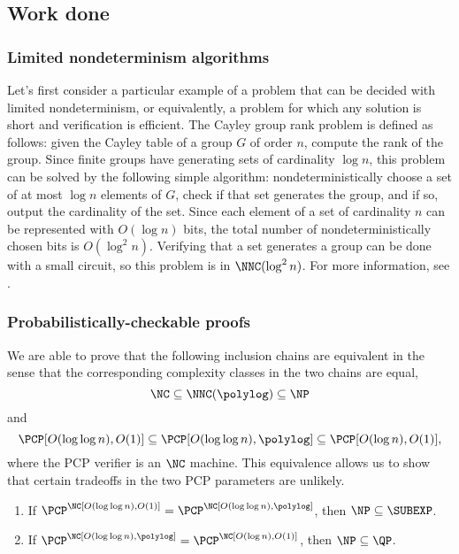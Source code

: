 \documentclass{article}
\begin{document}
\subsection{Work done}

\subsubsection{Limited nondeterminism algorithms}

Let's first consider a particular example of a problem that can be decided with limited nondeterminism, or equivalently, a problem for which any solution is short and verification is efficient.
The Cayley group rank problem is defined as follows: given the Cayley table of a group $G$ of order $n$, compute the rank of the group.
Since finite groups have generating sets of cardinality $\log n$, this problem can be solved by the following simple algorithm: nondeterministically choose a set of at most $\log n$ elements of $G$, check if that set generates the group, and if so, output the cardinality of the set.
Since each element of a set of cardinality $n$ can be represented with $O(\log n)$ bits, the total number of nondeterministically chosen bits is $O(\log^2 n)$.
Verifying that a set generates a group can be done with a small circuit, so this problem is in $\NNC(\log^2 n)$.
For more information, see \autocite{grouprank}.

\subsubsection{Probabilistically-checkable proofs}
\label{sec:ncpcp}

We are able to prove that the following inclusion chains are equivalent in the sense that the corresponding complexity classes in the two chains are equal,
\begin{equation*}
  \NC \subseteq \NNC(\polylog) \subseteq \NP
\end{equation*}
and
\begin{equation*}
  \PCP[O(\log \log n), O(1)] \subseteq \PCP[O(\log \log n), \polylog] \subseteq \PCP[O(\log n), O(1)],
\end{equation*}
where the PCP verifier is an $\NC$ machine.
This equivalence allows us to show that certain tradeoffs in the two PCP parameters are unlikely.
\begin{theorem}
  \mbox{}
  \begin{enumerate}
  \item If $\PCP^\NC[O(\log \log n), O(1)] = \PCP^\NC[O(\log \log n), \polylog]$, then $\NP \subseteq \SUBEXP$.
  \item If $\PCP^\NC[O(\log \log n), \polylog] = \PCP^\NC[O(\log n), O(1)]$, then $\NP \subseteq \QP$.
  \end{enumerate}
\end{theorem}
\end{document}
